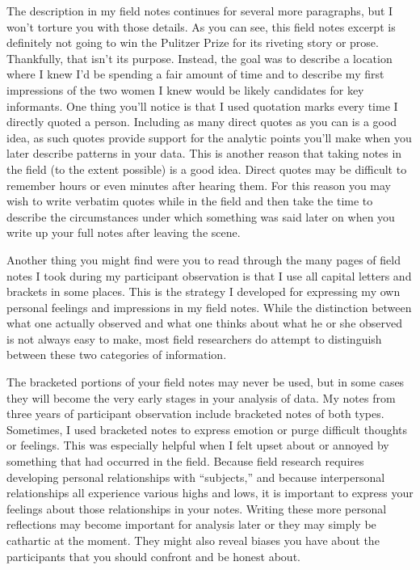 The description in my field notes continues for several more paragraphs, but I won’t torture you with those details. As you can see, this field notes excerpt is definitely not going to win the Pulitzer Prize for its riveting story or prose. Thankfully, that isn’t its purpose. Instead, the goal was to describe a location where I knew I’d be spending a fair amount of time and to describe my first impressions of the two women I knew would be likely candidates for key informants. One thing you’ll notice is that I used quotation marks every time I directly quoted a person. Including as many direct quotes as you can is a good idea, as such quotes provide support for the analytic points you’ll make when you later describe patterns in your data. This is another reason that taking notes in the field (to the extent possible) is a good idea. Direct quotes may be difficult to remember hours or even minutes after hearing them. For this reason you may wish to write verbatim quotes while in the field and then take the time to describe the circumstances under which something was said later on when you write up your full notes after leaving the scene.

Another thing you might find were you to read through the many pages of field notes I took during my participant observation is that I use all capital letters and brackets in some places. This is the strategy I developed for expressing my own personal feelings and impressions in my field notes. While the distinction between what one actually observed and what one thinks about what he or she observed is not always easy to make, most field researchers do attempt to distinguish between these two categories of information.

The bracketed portions of your field notes may never be used, but in some cases they will become the very early stages in your analysis of data. My notes from three years of participant observation include bracketed notes of both types. Sometimes, I used bracketed notes to express emotion or purge difficult thoughts or feelings. This was especially helpful when I felt upset about or annoyed by something that had occurred in the field. Because field research requires developing personal relationships with “subjects,” and because interpersonal relationships all experience various highs and lows, it is important to express your feelings about those relationships in your notes. Writing these more personal reflections may become important for analysis later or they may simply be cathartic at the moment. They might also reveal biases you have about the participants that you should confront and be honest about.

